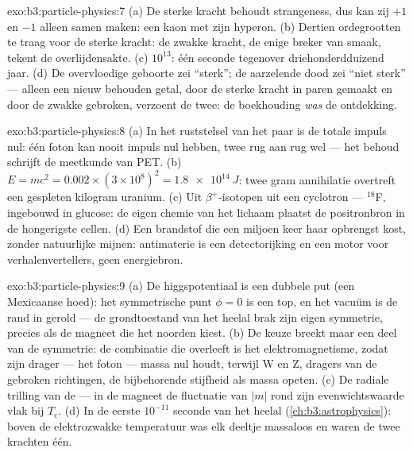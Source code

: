 \begin{solution}{exo:b3:particle-physics:7}
(a) De sterke kracht behoudt strangeness, dus kan zij $+1$ en $-1$
alleen samen maken: een kaon met zijn hyperon. (b) Dertien
ordegrootten te traag voor de sterke kracht: de zwakke
kracht, de enige breker van smaak, tekent de overlijdensakte.
(c) $10^{13}$: één seconde tegenover driehonderdduizend jaar.
(d) De overvloedige geboorte zei ``sterk''; de aarzelende dood zei ``niet
sterk'' --- alleen een nieuw behouden getal, door de sterke
kracht in paren gemaakt en door de zwakke gebroken, verzoent de twee: de
boekhouding \emph{was} de ontdekking.
\end{solution}

\begin{solution}{exo:b3:particle-physics:8}
(a) In het ruststelsel van het paar is de totale impuls nul: één
foton kan nooit impuls nul hebben, twee rug aan rug wel ---
het behoud schrijft de meetkunde van PET. (b) $E = mc^2 =
0.002\times(3\times10^8)^2 = \qty{1.8e14}{J}$: twee gram
annihilatie overtreft een gespleten kilogram uranium. (c) Uit
$\beta^+$-isotopen uit een cyclotron --- $^{18}$F, ingebouwd in
glucose: de eigen chemie van het lichaam plaatst de positronbron in
de hongerigste cellen. (d) Een brandstof die een miljoen keer haar
opbrengst kost, zonder natuurlijke mijnen: antimaterie is een
detectorijking en een motor voor verhalenvertellers, geen energiebron.
\end{solution}

\begin{solution}{exo:b3:particle-physics:9}
(a) De higgspotentiaal is een dubbele put (een Mexicaanse hoed): het
symmetrische punt $\phi = 0$ is een top, en het vacuüm is de rand
in gerold --- de grondtoestand van het heelal brak zijn eigen
symmetrie, precies als de magneet die het noorden kiest. (b) De keuze
breekt maar een deel van de symmetrie: de combinatie die overleeft
is het elektromagnetisme, zodat zijn drager --- het foton ---
massa nul houdt, terwijl W en Z, dragers van de gebroken richtingen,
de bijbehorende stijfheid als massa opeten. (c) De radiale
trilling van de  --- in de magneet de
fluctuatie van $|m|$ rond zijn evenwichtswaarde vlak bij
$T_{\text{c}}$. (d) In de eerste $10^{-11}$ seconde van het
heelal (\cref{ch:b3:astrophysics}): boven de elektrozwakke
temperatuur was elk deeltje massaloos en waren de twee krachten
één.
\end{solution}

